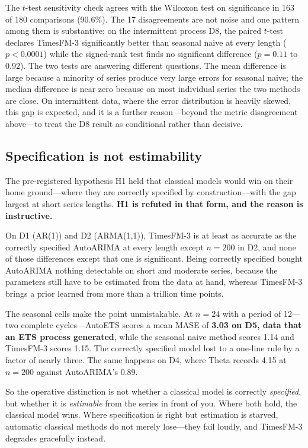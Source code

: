 \documentclass[article]{ajs}
\begin{document}
The $t$-test sensitivity check agrees with the Wilcoxon test on significance in 163 of 180
comparisons (90.6\%). The 17 disagreements are not noise and one pattern among them is
substantive: on the intermittent process D8, the paired $t$-test declares TimesFM-3 significantly
better than seasonal naive at every length ($p < 0.0001$) while the signed-rank test finds no
significant difference ($p = 0.11$ to $0.92$). The two tests are answering different questions.
The mean difference is large because a minority of series produce very large errors for seasonal
naive; the median difference is near zero because on most individual series the two methods are
close. On intermittent data, where the error distribution is heavily skewed, this gap is expected,
and it is a further reason---beyond the metric disagreement above---to treat the D8 result as
conditional rather than decisive.

\subsection{Specification is not estimability}
\label{sec:estimability}

The pre-registered hypothesis H1 held that classical models would win on their home
ground---where they are correctly specified by construction---with the gap largest at short
series lengths. \textbf{H1 is refuted in that form, and the reason is instructive.}

On D1 (AR(1)) and D2 (ARMA(1,1)), TimesFM-3 is at least as accurate as the correctly specified
AutoARIMA at every length except $n = 200$ in D2, and none of those differences except that one
is significant. Being correctly specified bought AutoARIMA nothing detectable on short and
moderate series, because the parameters still have to be estimated from the data at hand,
whereas TimesFM-3 brings a prior learned from more than a trillion time points.

The seasonal cells make the point unmistakable. At $n = 24$ with a period of 12---two complete
cycles---AutoETS scores a mean MASE of \textbf{3.03 on D5, data that an ETS process generated},
while the seasonal naive method scores 1.14 and TimesFM-3 scores 1.15. The correctly specified
model lost to a one-line rule by a factor of nearly three. The same happens on D4, where Theta
records 4.15 at $n = 200$ against AutoARIMA's 0.89.

So the operative distinction is not whether a classical model is correctly \emph{specified},
but whether it is \emph{estimable} from the series in front of you. Where both hold, the
classical model wins. Where specification is right but estimation is starved, automatic
classical methods do not merely lose---they fail loudly, and TimesFM-3 degrades gracefully
instead.
\end{document}
